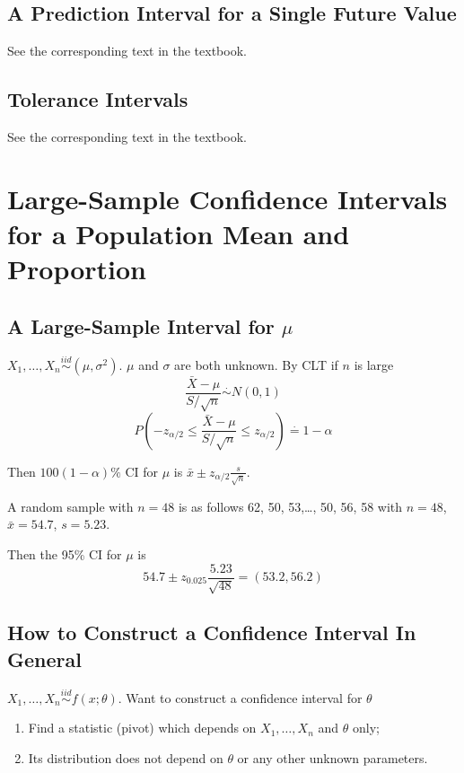 \subsection{A Prediction Interval for a Single Future Value}
See the corresponding text in the textbook.
\subsection{Tolerance Intervals}
See the corresponding text in the textbook.

\section{Large-Sample Confidence Intervals for a Population Mean and Proportion}
\subsection{A Large-Sample Interval for $\mu$}
\begin{prop}
$X_1,\dots,X_n \overset{iid}{\sim} (\mu,\sigma^2)$. $\mu$ and $\sigma$ are both unknown. By CLT if $n$ is large
\[\frac{\bar{X}-\mu}{S/\sqrt{n}} \overset{\cdot}{\sim} N(0,1)\]
\[P\left(-z_{\alpha/2} \leq \frac{\bar{X}-\mu}{S/\sqrt{n}}  \leq  z_{\alpha/2} \right) \overset{\cdot}{=} 1-\alpha\]

Then $100(1-\alpha)\%$ CI for $\mu$ is $\bar{x} \pm  z_{\alpha/2} \frac{s}{\sqrt{n}}$.
\end{prop}

\begin{exmp}
A random sample with $n=48$ is as follows 62, 50, 53,\dots, 50, 56, 58 with $n=48$, $\bar{x}=54.7$, $s=5.23$.

Then the 95\% CI for $\mu$ is 
\[54.7 \pm  z_{0.025} \frac{5.23}{\sqrt{48}}=(53.2, 56.2)\]
\end{exmp}

\subsection{How to Construct a Confidence Interval In General}
$X_1,\dots,X_n \overset{iid}{\sim} f(x;\theta)$. Want to construct a confidence interval for $\theta$
\begin{enumerate}
\item Find a statistic (pivot) which depends on $X_1,\dots,X_n $ and $\theta$ only;
\item Its distribution does not depend on $\theta$ or any other unknown parameters.
\end{enumerate}


